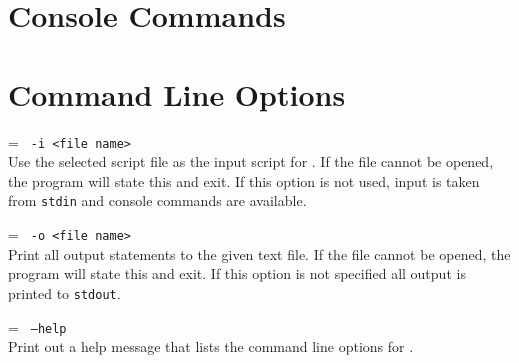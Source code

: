 \section{Console Commands}
\label{consoleCommands}

\section{Command Line Options}
\label{commandLineOptions}

\noindent\hangindent=\parindent
\texttt{%
-i <file name>
}\\
Use the selected script file as the input script for \progLogo. If the file
cannot be opened, the program will state this and exit. If this option is
not used, input is taken from \texttt{stdin} and console commands are
available.

\breakline

\noindent\hangindent=\parindent
\texttt{%
-o <file name>
}\\
Print all output statements to the given text file. If the file cannot be
opened, the program will state this and exit. If this option is not specified
all output is printed to \texttt{stdout}.

\breakline

\noindent\hangindent=\parindent
\texttt{%
--help
}\\
Print out a help message that lists the command line options for \progLogo.


